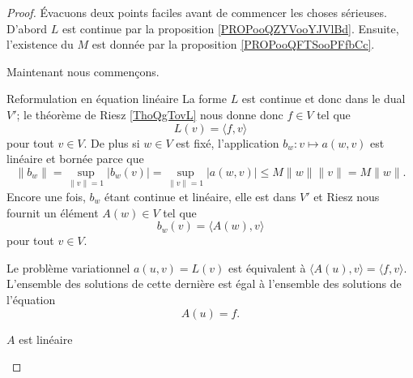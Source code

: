 \begin{proof}
    Évacuons deux points faciles avant de commencer les choses sérieuses. D'abord \( L\) est continue par la proposition \ref{PROPooQZYVooYJVlBd}. Ensuite, l'existence du \( M\) est donnée par la proposition \ref{PROPooQFTSooPFfbCc}.

    Maintenant nous commençons.

    \begin{subproof}
        \item[Reformulation en équation linéaire]
            La forme \( L\) est continue et donc dans le dual \( V'\); le théorème de Riesz \ref{ThoQgTovL} nous donne donc \( f\in V\) tel que
            \begin{equation}
                L(v)=\langle f, v\rangle 
            \end{equation}
            pour tout \( v\in V\). De plus si \( w\in V\) est fixé, l'application \( b_w\colon v\mapsto a(w,v)\) est linéaire et bornée parce que
            \begin{equation}
                \| b_w \|=\sup_{\| v \|=1}| b_w(v) |=\sup_{\| v \|=1}| a(w,v) |\leq M\| w \|\| v \|=M\| w \|.   
            \end{equation}
            Encore une fois, \( b_w\) étant continue et linéaire, elle est dans \( V'\) et Riesz nous fournit un élément \( A(w)\in V\) tel que
            \begin{equation}
                b_w(v)=\langle A(w), v\rangle 
            \end{equation}
            pour tout \( v\in V\). 

            Le problème variationnel \( a(u,v)=L(v)\) est équivalent à \( \langle A(u), v\rangle =\langle f, v\rangle \). L'ensemble des solutions de cette dernière est égal à l'ensemble des solutions de l'équation
            \begin{equation}        \label{EQooLPMPooMVuYUX}
                A(u)=f.
            \end{equation}
        \item[\( A\) est linéaire]


\end{subproof}
\end{proof}
